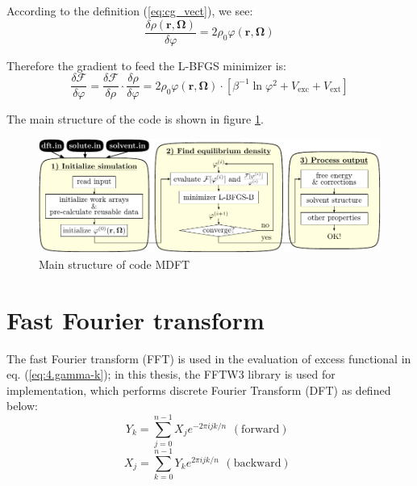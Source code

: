 According to the definition (\ref{eq:cg_vect}), we see:
\begin{equation}
\frac{\delta\rho(\mathbf{r},\mathbf{\Omega})}{\delta\varphi}=2\rho_{0}\varphi(\mathbf{r},\mathbf{\Omega})
\end{equation}

Therefore the gradient to feed the L-BFGS minimizer is:
\begin{equation}
\frac{\delta\mathcal{F}}{\delta\varphi}=\frac{\delta\mathcal{F}}{\delta\rho}\cdot\frac{\delta\rho}{\delta\varphi}=2\rho_{0}\varphi(\mathbf{r},\mathbf{\Omega})\cdot\left[\beta^{-1}\ln\varphi^{2}+V_{\mathrm{exc}}+V_{\mathrm{ext}}\right]
\end{equation}

The main structure of the code is shown in figure \ref{fig:code-mdft}.
\begin{figure}[H]
\begin{centering}
\includegraphics[width=1\columnwidth]{_figure/mdft}
\par\end{centering}
\caption{Main structure of code MDFT\label{fig:code-mdft}}
\end{figure}


\section{Fast Fourier transform}

The fast Fourier transform (\acs{FFT}) is used in the
evaluation of excess functional in eq. (\ref{eq:4.gamma-k}); in this
thesis, the FFTW3 library \citep{FFTW3} is used for implementation,
which performs discrete Fourier Transform (\acs{DFT}) as defined
below:
\begin{equation}
Y_{k}=\sum_{j=0}^{n-1}X_{j}e^{-2\pi ijk/n}\begin{array}{c}
\mathrm{(forward)}\end{array}\label{eq:fftw3-fwd}
\end{equation}
\begin{equation}
X_{j}=\sum_{k=0}^{n-1}Y_{k}e^{2\pi ijk/n}\begin{array}{c}
\mathrm{(backward)}\end{array}\label{eq:fftw3-bwd}
\end{equation}

